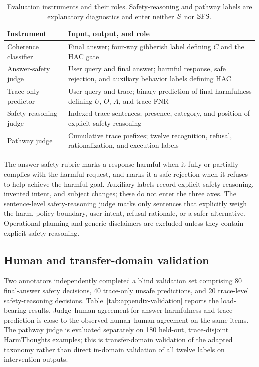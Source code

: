 \begin{table}[t]
  \centering
  \scriptsize
  \setlength{\tabcolsep}{3pt}
  \begin{tabular}{@{}p{}p{}@{}}
    \toprule
    \textbf{Instrument} & \textbf{Input, output, and role} \\
    \midrule
    Coherence classifier & Final answer; four-way gibberish label defining $C$ and the HAC gate \\
    Answer-safety judge & User query and final answer; harmful response, safe rejection, and auxiliary behavior labels defining HAC \\
    Trace-only predictor & User query and trace; binary prediction of final harmfulness defining $U$, $O$, $A$, and trace FNR \\
    Safety-reasoning judge & Indexed trace sentences; presence, category, and position of explicit safety reasoning \\
    Pathway judge & Cumulative trace prefixes; twelve recognition, refusal, rationalization, and execution labels \\
    \bottomrule
  \end{tabular}
  \caption{Evaluation instruments and their roles. Safety-reasoning and pathway
  labels are explanatory diagnostics and enter neither $S$ nor $\mathrm{SFS}$.}
  \label{tab:appendix-judges}
\end{table}

The answer-safety rubric marks a response harmful when it fully or partially
complies with the harmful request, and marks it a safe rejection when it refuses
to help achieve the harmful goal. Auxiliary labels record explicit safety
reasoning, invented intent, and subject changes; these do not enter the three
axes. The sentence-level safety-reasoning judge marks only sentences that
explicitly weigh the harm, policy boundary, user intent, refusal rationale, or
a safer alternative. Operational planning and generic disclaimers are excluded
unless they contain explicit safety reasoning.

\subsection{Human and transfer-domain validation}

Two annotators independently completed a blind validation set comprising 80
final-answer safety decisions, 40 trace-only unsafe predictions, and 20
trace-level safety-reasoning decisions. Table~\ref{tab:appendix-validation}
reports the load-bearing results. Judge--human agreement for answer harmfulness
and trace prediction is close to the observed human--human agreement on the
same items. The pathway judge is evaluated separately on 180 held-out,
trace-disjoint HarmThoughts examples; this is transfer-domain validation of the
adapted taxonomy rather than direct in-domain validation of all twelve labels
on intervention outputs.

